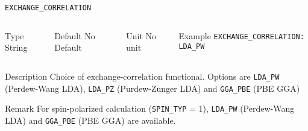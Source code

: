 \begin{frame}[allowframebreaks]{\texttt{{EXCHANGE\_CORRELATION}}} \label{EXCHANGE_CORRELATION}
\vspace*{-12pt}
\begin{columns}
\begin{block}{Type}
String
\end{block}

\begin{block}{Default}
No Default
\end{block}

\begin{block}{Unit}
No unit
\end{block}

\begin{block}{Example}
\texttt{EXCHANGE\_CORRELATION: LDA\_PW}
\end{block}
\end{columns}

\begin{block}{Description}
Choice of exchange-correlation functional. Options are \texttt{LDA\_PW} (Perdew-Wang LDA), \texttt{LDA\_PZ} (Purdew-Zunger LDA) and \texttt{GGA\_PBE} (PBE GGA)
\end{block}

\begin{block}{Remark}
For spin-polarized calculation (\texttt{{SPIN\_TYP}} = 1),  \texttt{LDA\_PW} (Perdew-Wang LDA) and \texttt{GGA\_PBE} (PBE GGA) are available.
\end{block}


\end{frame}


